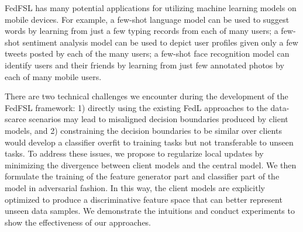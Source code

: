 FedFSL has many potential applications for utilizing machine learning models on mobile devices. For example, a few-shot language model can be used to suggest words by learning from just a few typing records from each of many users; a few-shot sentiment analysis model can be used to depict user profiles given only a few tweets posted by each of the many users; a few-shot face recognition model can identify users and their friends by learning from just few annotated photos by each of many mobile users.




There are two technical challenges we encounter during the development of the FedFSL framework: 1) directly using the existing FedL approaches to the data-scarce scenarios may lead to misaligned decision boundaries produced by client models, and 2) constraining the decision boundaries to be similar over clients would develop a classifier overfit to training tasks but not transferable to unseen tasks. To address these issues, we propose to regularize local updates by minimizing the divergence between client models and the central model. We then formulate the training of the feature generator part and classifier part of the model in adversarial fashion. In this way, the client models are explicitly optimized to produce a discriminative feature space that can better represent unseen data samples. We demonstrate the intuitions and conduct experiments to show the effectiveness of our approaches.


